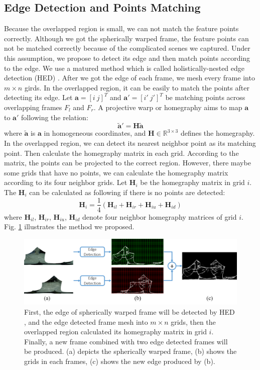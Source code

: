 \documentclass[conference]{IEEEtran}
\begin{document}
\subsection{Edge Detection and Points Matching}
\label{ssec:edge-detection}
Because the overlapped region is small, we can not match the feature points correctly. Although we got the spherically warped frame, the feature points can not be
matched correctly because of the complicated scenes we captured. Under this assumption, we propose to detect its edge and then match points according to the edge.
We use a matured method which is called holistically-nested edge detection (HED) \cite{xie2015holistically}. After we got the edge of each frame, we mesh every frame into $m \times n$
girds. In the overlapped region, it can be easily to match the points after detecting its edge. Let $\textbf{a} = [i \ j]^T$ and $\textbf{a}' = [i' \ j']^T$ be matching points
across overlapping frames $F_l$ and $F_r$. A projective warp or homegraphy aims to map $\textbf{a}$ to $\textbf{a}'$ following the relation:
\begin{equation}
\widetilde{\textbf{a}}'=\textbf{H}\widetilde{\textbf{a}}
\end{equation}
where $\widetilde{\textbf{a}}$ is $\textbf{a}$ in homogeneous coordinates, and $\textbf{H}\in\mathbb{R}^{3 \times 3}$ defines the homegraphy. In the overlapped region,
we can detect its nearest neighbor point as its matching point. Then calculate the homegraphy matrix in each grid. According to the matrix, the points can be projected to the correct region.
However, there maybe some grids that have no points, we can calculate the homegraphy matrix according to its four neighbor grids. Let $\textbf{H}_i$ be the homegraphy matrix in grid $i$.
The $\textbf{H}_{i}$ can be calculated as following if there is no points are detected:
\begin{equation}
\textbf{H}_{i} = \frac{1}{4}\left(\textbf{H}_{il}+\textbf{H}_{ir}+\textbf{H}_{iu}+\textbf{H}_{id}\right)
\end{equation} 
where $\textbf{H}_{il}$, 
$\textbf{H}_{ir}$, 
$\textbf{H}_{iu}$, 
$\textbf{H}_{id}$ 
denote four neighbor homegraphy matrices of grid $i$.
Fig. \ref{fig:p8} illustrates the method we proposed.
\begin{figure}[!htpb]
\centering
\includegraphics[scale=0.22]{picture41.png}
\caption{First, the edge of spherically warped frame will be detected by HED \cite{xie2015holistically}, and the edge detected frame mesh into $m \times n$ grids, 
then the overlapped region calculated its homegraphy matrix in grid $i$.
Finally, a new frame combined with two edge detected frames will be produced. (a) depicts the spherically
warped frame, (b) shows the grids in each frames, (c) shows the new edge produced by (b).}
\label{fig:p8}
\end{figure}
\end{document}
